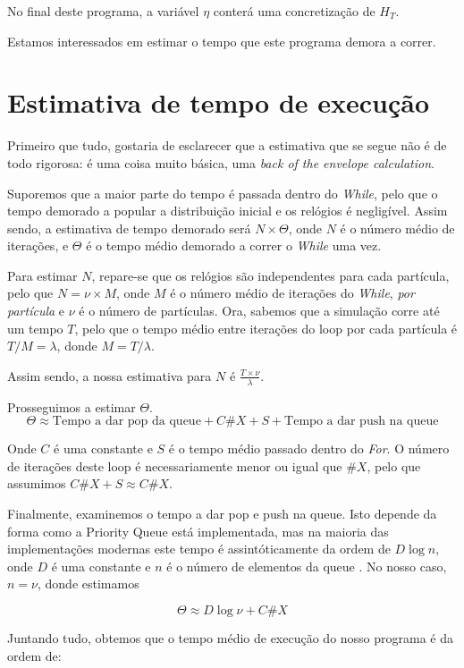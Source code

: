 \documentclass{article}
\begin{document}
	No final deste programa, a variável $\eta$ conterá uma concretização de $H_T$.
	
	Estamos interessados em estimar o tempo que este programa demora a correr.
	
	\section{Estimativa de tempo de execução}
	
	Primeiro que tudo, gostaria de esclarecer que a estimativa que se segue não é de todo rigorosa: é uma coisa muito básica, uma \emph{back of the envelope calculation}.
	
	Suporemos que a maior parte do tempo é passada dentro do \emph{While}, pelo que o tempo demorado a popular a distribuição inicial e os relógios é negligível. Assim sendo, a estimativa de tempo demorado será $N \times \Theta$, onde $N$ é o número médio de iterações, e $\Theta$ é o tempo médio demorado a correr o \emph{While} uma vez.
	
	Para estimar $N$, repare-se que os relógios são independentes para cada partícula, pelo que $N = \nu \times M$, onde $M$ é o número médio de iterações do \emph{While}, \emph{por partícula} e $\nu$ é o número de partículas. Ora, sabemos que a simulação corre até um tempo $T$, pelo que o tempo médio entre iterações do loop por cada partícula é $T/M = \lambda$, donde $M = T/\lambda$.
	
	Assim sendo, a nossa estimativa para $N$ é $\frac{T \times \nu}\lambda$.
	
	Prosseguimos a estimar $\Theta$.
	\[\Theta \approx \text{Tempo a dar pop da queue} + C \#X + S + \text{Tempo a dar push na queue}\]
	
	Onde $C$ é uma constante e $S$ é o tempo médio passado dentro do \emph{For}. O número de iterações deste loop é necessariamente menor ou igual que $\#X$, pelo que assumimos $C \#X + S \approx C \#X$.
	
	Finalmente, examinemos o tempo a dar pop e push na queue. Isto depende da forma como a Priority Queue está implementada, mas na maioria das implementações modernas este tempo é assintóticamente da ordem de $D \log n$, onde $D$ é uma constante e $n$ é o número de elementos da queue \cite{wiki}. No nosso caso, $n = \nu$, donde estimamos
	
	\[\Theta \approx D \log \nu + C \#X\]
	
	Juntando tudo, obtemos que o tempo médio de execução do nosso programa é da ordem de:
	
\end{document}
